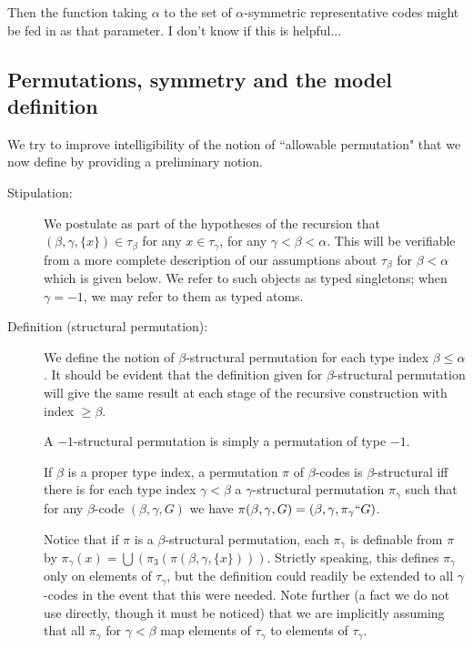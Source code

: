 \documentclass[112pt]{article}
\begin{document}
Then the function taking $\alpha$ to the set of $\alpha$-symmetric representative codes might be fed in as that parameter.  I don't know if this is helpful...


\subsection{Permutations, symmetry and the model definition}

We try to improve intelligibility of the notion of ``allowable permutation" that we now define by providing a preliminary notion.

\begin{description}

\item[Stipulation:]  We postulate as part of the hypotheses of the recursion that $(\beta,\gamma,\{x\}) \in \tau_\beta$ for any $x \in \tau_\gamma$, for any $\gamma<\beta<\alpha$.  This will be verifiable from a more complete description of our assumptions about $\tau_\beta$ for $\beta<\alpha$ which is given below.  We refer to such objects as typed singletons;  when $\gamma=-1$, we may refer to them as typed atoms.

\item[Definition (structural permutation):]  We define the notion of $\beta$-structural permutation for each type index $\beta \leq \alpha$.  It should be evident that the definition given for $\beta$-structural permutation will give the same result at each stage of the recursive construction with index $\geq \beta$.

A $-1$-structural permutation is simply a permutation of type $-1$.

If $\beta$ is a proper type index, a permutation $\pi$ of $\beta$-codes is $\beta$-structural iff there is for each type index $\gamma<\beta$ a
$\gamma$-structural permutation $\pi_\gamma$ such that for any $\beta$-code $(\beta,\gamma,G)$ we have $\pi(\beta,\gamma,G) = (\beta,\gamma,\pi_\gamma``G)$.

Notice that if $\pi$ is a $\beta$-structural permutation, each $\pi_\gamma$ is definable from $\pi$ by $\pi_\gamma(x) = \bigcup(\pi_3(\pi(\beta,\gamma,\{x\})))$.  Strictly speaking, this defines $\pi_\gamma$ only on elements of $\tau_\gamma$, but the definition could readily be extended to all $\gamma$-codes in the event that this were needed.  Note further (a fact we do not use directly, though it must be noticed) that we are implicitly assuming that all $\pi_\gamma$ for $\gamma<\beta$
map elements of $\tau_\gamma$ to elements of $\tau_\gamma$.


\end{description}
\end{document}
